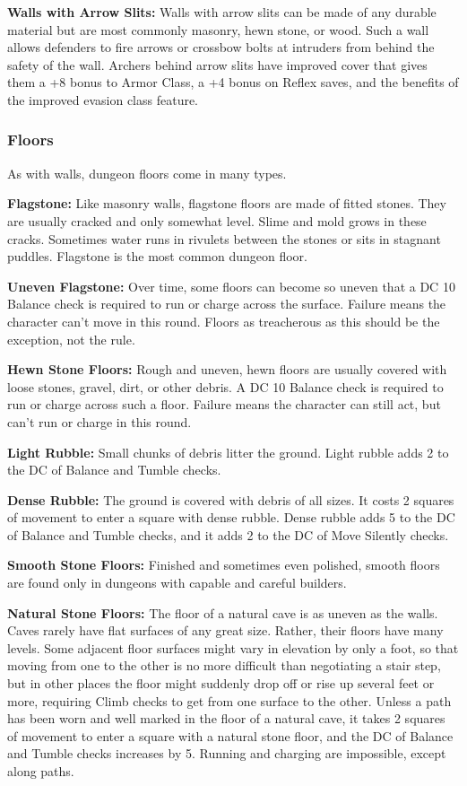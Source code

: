 \textbf{Walls with Arrow Slits:} Walls with arrow slits can be made of any durable material but are most commonly masonry, hewn stone, or wood. Such a wall allows defenders to fire arrows or crossbow bolts at intruders from behind the safety of the wall. Archers behind arrow slits have improved cover that gives them a +8 bonus to Armor Class, a +4 bonus on Reflex saves, and the benefits of the improved evasion class feature.

\subsubsection{Floors}

As with walls, dungeon floors come in many types.

\textbf{Flagstone:} Like masonry walls, flagstone floors are made of fitted stones. They are usually cracked and only somewhat level. Slime and mold grows in these cracks. Sometimes water runs in rivulets between the stones or sits in stagnant puddles. Flagstone is the most common dungeon floor.

\textbf{Uneven Flagstone:} Over time, some floors can become so uneven that a DC 10 Balance check is required to run or charge across the surface. Failure means the character can't move in this round. Floors as treacherous as this should be the exception, not the rule.

\textbf{Hewn Stone Floors:} Rough and uneven, hewn floors are usually covered with loose stones, gravel, dirt, or other debris. A DC 10 Balance check is required to run or charge across such a floor. Failure means the character can still act, but can't run or charge in this round.

\textbf{Light Rubble:} Small chunks of debris litter the ground. Light rubble adds 2 to the DC of Balance and Tumble checks.

\textbf{Dense Rubble:} The ground is covered with debris of all sizes. It costs 2 squares of movement to enter a square with dense rubble. Dense rubble adds 5 to the DC of Balance and Tumble checks, and it adds 2 to the DC of Move Silently checks.

\textbf{Smooth Stone Floors:} Finished and sometimes even polished, smooth floors are found only in dungeons with capable and careful builders. 

\textbf{Natural Stone Floors:} The floor of a natural cave is as uneven as the walls. Caves rarely have flat surfaces of any great size. Rather, their floors have many levels. Some adjacent floor surfaces might vary in elevation by only a foot, so that moving from one to the other is no more difficult than negotiating a stair step, but in other places the floor might suddenly drop off or rise up several feet or more, requiring Climb checks to get from one surface to the other. Unless a path has been worn and well marked in the floor of a natural cave, it takes 2 squares of movement to enter a square with a natural stone floor, and the DC of Balance and Tumble checks increases by 5. Running and charging are impossible, except along paths.

